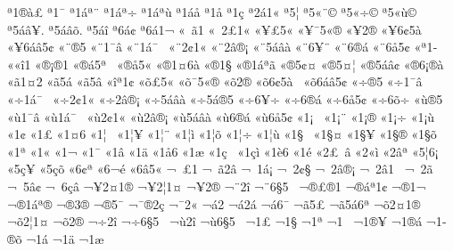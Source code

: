{^^aa1^^ae^^e0^^a3
^^aa1^^af
^^aa1^^e1^^aa^^a8
^^aa1^^e1^^aa^^f7
^^aa1^^e1^^aa^^f9
^^aa1^^e1^^e5
^^aa1^^e5
^^aa1^^e7
^^aa2^^e11^^ab
^^aa5^^a6
^^aa5^^ab^^a8^^a9
^^aa5^^ab^^f7^^a9
^^aa5^^ab^^f9^^a9
^^aa5^^e1^^e2^^a5.
^^aa5^^e1^^e2^^f5.
^^aa5^^e1^^ee
^^aa6^^e1^^a2
^^aa6^^e11^^ac
^^ab^^a0^^e31
^^ab^^a02^^a31^^ab
^^ab^^a5^^a35^^ab
^^ab^^a5^^af5^^ab^^ae
^^ab^^a52^^ae
^^ab^^a56^^a25^^e0^^a0
^^ab^^a56^^e1^^e25^^a2
^^ab^^a8^^ae5
^^ab^^a81^^af^^e2
^^ab^^a81^^e1^^af^^a0
^^ab^^a82^^a21^^ab
^^ab^^a82^^e2^^ae^^a1
^^ab^^a85^^e1^^e2^^e0
^^ab^^a86^^a5^^ad^^a8
^^ab^^a86^^ae^^e1
^^ab^^a86^^e55^^a2
^^ab^^aa1^^ad
^^ab^^ab^^ee1
^^ab^^ae^^a1^^ae1
^^ab^^ae^^e15^^aa^^a0
^^ab^^ae^^e55^^ab
^^ab^^ae1^^a46^^e0
^^ab^^ae1^^a7
^^ab^^ae1^^e1^^aa^^e3
^^ab^^ae5^^a2^^a4
^^ab^^ae5^^a4^^a6
^^ab^^ae5^^e1^^e2^^a2
^^ab^^ae6^^a1^^ae^^e0
^^ab^^e31^^a42
^^ab^^e35^^e1
^^ab^^e35^^e2
^^ab^^ee^^aa1^^a2
^^ab^^f5^^a35^^ab
^^ab^^f5^^af5^^ab^^ae
^^ab^^f52^^ae
^^ab^^f56^^a25^^e0^^a0
^^ab^^f56^^e1^^e25^^a2
^^ab^^f7^^ae5
^^ab^^f71^^af^^e2
^^ab^^f71^^e1^^af^^a0
^^ab^^f72^^a21^^ab
^^ab^^f72^^e2^^ae^^a1
^^ab^^f75^^e1^^e2^^e0
^^ab^^f75^^e1^^ae5
^^ab^^f76^^a5^^ad^^f7
^^ab^^f76^^ae^^e1
^^ab^^f76^^e55^^a2
^^ab^^f76^^f5^^ad^^f7
^^ab^^f9^^ae5
^^ab^^f91^^af^^e2
^^ab^^f91^^e1^^af^^a0
^^ab^^f92^^a21^^ab
^^ab^^f92^^e2^^ae^^a1
^^ab^^f95^^e1^^e2^^e0
^^ab^^f96^^ae^^e1
^^ab^^f96^^e55^^a2
^^ab1^^a1^^a0
^^ab1^^a1^^a8
^^ab1^^a1^^ae
^^ab1^^a1^^f7
^^ab1^^a1^^f9
^^ab1^^a2
^^ab1^^a3
^^ab1^^a46
^^ab1^^a6^^a0
^^ab1^^a6^^a5
^^ab1^^a6^^a8
^^ab1^^a6^^ec
^^ab1^^a6^^f5
^^ab1^^a6^^f7
^^ab1^^a6^^f9
^^ab1^^a7^^a0
^^ab1^^a7^^a4
^^ab1^^a7^^a5
^^ab1^^a7^^ae
^^ab1^^a7^^f5
^^ab1^^aa
^^ab1^^ab
^^ab1^^ac
^^ab1^^af
^^ab1^^e2
^^ab1^^e4
^^ab1^^e56
^^ab1^^e6
^^ab1^^e7^^a0
^^ab1^^e7^^ec
^^ab1^^e86
^^ab1^^e9
^^ab2^^a3^^a0^^e2
^^ab2^^ab^^ec
^^ab2^^e2^^aa
^^ab5^^a66^^a1
^^ab5^^e7^^a5
^^ab5^^e7^^f5
^^ab6^^a2^^aa
^^ab6^^ac^^e9
^^ab6^^e25^^ab
^^ac^^a0^^a31^^ad
^^ac^^a0^^e32^^e2
^^ac^^a01^^e1^^a1
^^ac^^a02^^a2^^a7
^^ac^^a02^^e2^^ae^^a1
^^ac^^a02^^e21^^a0^^ad
^^ac^^a02^^e3
^^ac^^a05^^e2^^a2
^^ac^^a06^^e7^^e2
^^ac^^a52^^a41^^ae
^^ac^^a52^^a61^^a4
^^ac^^a52^^ae
^^ac^^a82^^ad^^ee
^^ac^^a86^^a75^^a0^^ad
^^ac^^ad^^ae^^a3^^ae1
^^ac^^ae^^e1^^aa1^^a2
^^ac^^ae1^^ac
^^ac^^ae1^^e1^^aa^^ae
^^ac^^ae3^^ae
^^ac^^ae5^^af
^^ac^^af^^ae2^^e7
^^ac^^af2^^ab
^^ac^^e12^^ad
^^ac^^e12^^e1
^^ac^^e16^^af
^^ac^^e35^^a3
^^ac^^e35^^e16^^aa
^^ac^^f52^^a41^^ae
^^ac^^f52^^a61^^a4
^^ac^^f52^^ae
^^ac^^f72^^ad^^ee
^^ac^^f76^^a75^^a0^^ad
^^ac^^f92^^ad^^ee
^^ac^^f96^^a75^^a0^^ad
^^ac1^^a3
^^ac1^^a7
^^ac1^^aa
^^ac1^^ad^^a0
^^ac1^^ad^^ae^^a5
^^ac1^^ad^^ae^^e1
^^ac1^^ad^^ae^^f5
^^ac1^^e1
^^ac1^^e4
^^ac1^^e6
}
